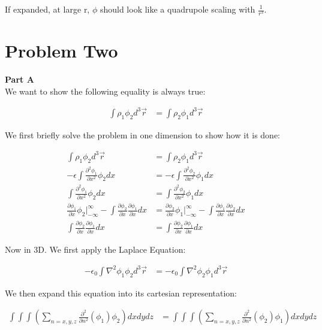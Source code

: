 \documentclass[10pt]{article} %
\begin{document}
If expanded, at large r, $\phi$ should look like a quadrupole scaling with $\frac{1}{r^3}$.\\

\section{Problem Two}
\textbf{Part A}\\
We want to show the following equality is always true:

\begin{align*}
  \int\rho_1\phi_2d^3\vec{r} &= \int\rho_2\phi_1d^3\vec{r}
\end{align*}

We first briefly solve the problem in one dimension to show how it is done:

\begin{align*}
  \int\rho_1\phi_2d^3\vec{r} &= \int\rho_2\phi_1d^3\vec{r}\\
  -\epsilon\int \frac{\partial^2\phi_1}{\partial x^2}\phi_2dx &= -\epsilon\int \frac{\partial^2\phi_2}{\partial x^2}\phi_1dx\\
  \int \frac{\partial^2\phi_1}{\partial x^2}\phi_2dx &= \int \frac{\partial^2\phi_2}{\partial x^2}\phi_1dx\\
  \frac{\partial \phi_1}{\partial x} \phi_2 \Big|_{-\infty}^{\infty} -
  \int \frac{\partial \phi_2}{\partial x}\frac{\partial \phi_1}{\partial x}dx&=
  \frac{\partial \phi_2}{\partial x} \phi_1 \Big|_{-\infty}^{\infty} -
  \int \frac{\partial \phi_1}{\partial x}\frac{\partial \phi_2}{\partial x}dx\\
  \int \frac{\partial \phi_2}{\partial x}\frac{\partial \phi_1}{\partial x}dx&=
  \int \frac{\partial \phi_2}{\partial x}\frac{\partial \phi_1}{\partial x}dx
\end{align*}

Now in 3D. We first apply the Laplace Equation:

\begin{align*}
  -\epsilon_0\int\nabla^2\phi_1\phi_2d^3\vec{r} &= -\epsilon_0\int\nabla^2\phi_2\phi_1d^3\vec{r}
\end{align*}

We then expand this equation into its cartesian representation:

\begin{align*}
  \int\int\int\left(\sum_{n=x,y,z}\frac{\partial^2}{\partial n^2} (\phi_1) \phi_2\right) dxdydz &=
  \int\int\int\left(\sum_{n=x,y,z}\frac{\partial^2}{\partial n^2} (\phi_2) \phi_1\right) dxdydz
\end{align*}
\end{document}
